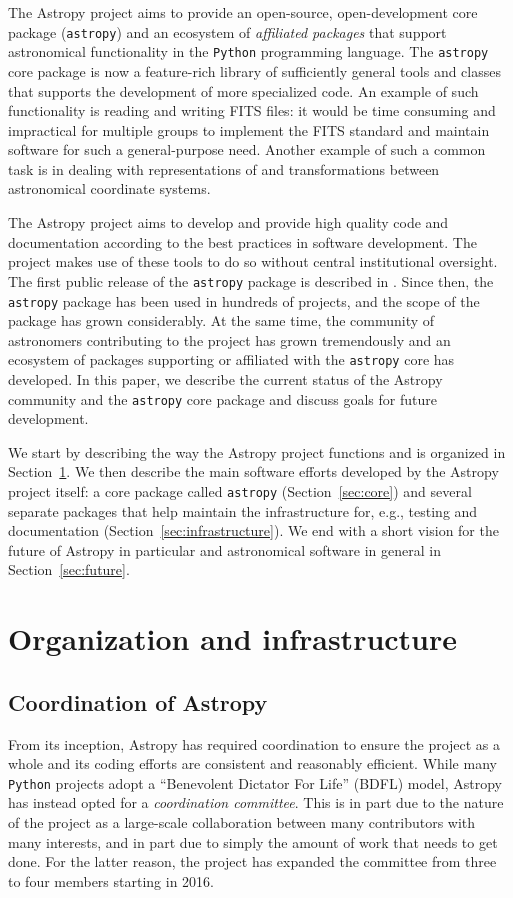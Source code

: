 \documentclass[modern]{aastex61}
\newcommand{\package}[1]{\texttt{#1}\xspace}
\newcommand{\python}{\package{Python}}
\newcommand{\astropy}{Astropy\xspace}
\newcommand{\astropypkg}{\package{astropy}}
\newcommand{\sectionname}{Section\xspace}
\begin{document}
The \astropy project aims to provide an open-source, open-development core
package (\astropypkg) and an ecosystem of \emph{affiliated packages} that
support astronomical functionality in the \python programming language.
The \astropypkg core package is now a feature-rich library of sufficiently
general tools and classes that supports the development of more specialized
code. An example of such functionality is reading and writing FITS files: it would be
time consuming and impractical for multiple groups to implement the FITS
standard \citep{FITS} and maintain software for such a general-purpose need.
Another example of such a common task is in dealing with representations of and
transformations between astronomical coordinate systems.

The \astropy project aims to develop and provide high quality code and
documentation according to the best practices in software development.
The project makes use of these tools to do so without central institutional
oversight.
The first public release of the \astropypkg package is described in
\cite{astropy}. Since then, the \astropypkg package has been
used in hundreds of projects, and the scope of the package has grown
considerably. At the same time, the community of astronomers
contributing to the project has grown tremendously and an ecosystem
of packages supporting or affiliated with the \astropypkg core has
developed.
In this paper, we describe the current status of the \astropy community and the
\astropypkg core package and discuss goals for future development.

We start by describing the way the \astropy project functions and is organized
in \sectionname~\ref{sec:org}. We then describe the main software efforts
developed by the \astropy project itself: a core package called \astropypkg
(\sectionname~\ref{sec:core}) and several separate packages that help maintain
the infrastructure for, e.g., testing and documentation
(\sectionname~\ref{sec:infrastructure}). We end with a short vision for
the future of \astropy in particular and astronomical software in general
in \sectionname~\ref{sec:future}.

\section{Organization and infrastructure}
\label{sec:org}

\subsection{Coordination of Astropy}
\label{sect:coordcom}
From its inception, \astropy has required coordination to ensure the project
as a whole and its coding efforts are consistent and reasonably efficient.
While many \python projects adopt a ``Benevolent Dictator For Life'' (BDFL)
model, \astropy has instead opted for a \emph{coordination committee}.  This
is in part due to the nature of the project as a large-scale collaboration
between many contributors with many interests, and in part due to simply the
amount of work that needs to get done.  For the latter reason, the
project has expanded the committee from three to four members starting in
2016.
\end{document}

